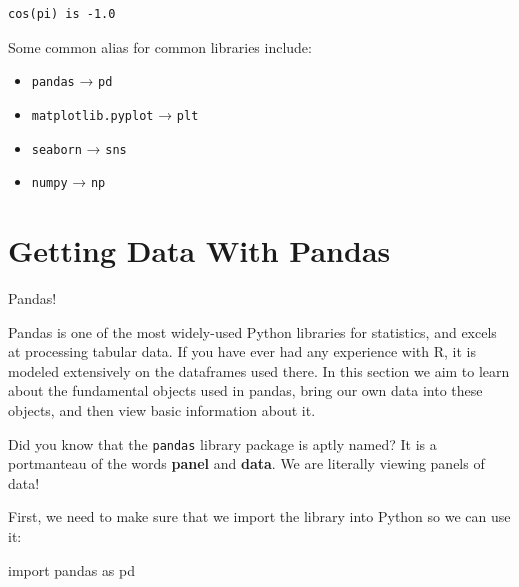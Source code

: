 \documentclass[
  letterpaper,
  DIV=11,
  numbers=noendperiod]{scrreprt}
\newenvironment{Shaded}{\begin{snugshade}}{\end{snugshade}}
\newcommand{\ImportTok}[1]{\textcolor[rgb]{0.00,0.46,0.62}{#1}}
\newcommand{\NormalTok}[1]{\textcolor[rgb]{0.00,0.23,0.31}{#1}}
\providecommand{\tightlist}{%
  \setlength{\itemsep}{0pt}\setlength{\parskip}{0pt}}\usepackage{longtable,booktabs,array}
\begin{document}
\begin{verbatim}
cos(pi) is -1.0
\end{verbatim}

Some common alias for common libraries include:

\begin{itemize}
\tightlist
\item
  \texttt{pandas} → \texttt{pd}
\item
  \texttt{matplotlib.pyplot} → \texttt{plt}
\item
  \texttt{seaborn} → \texttt{sns}
\item
  \texttt{numpy} → \texttt{np}
\end{itemize}


\hypertarget{getting-data-with-pandas}{%
\chapter{Getting Data With Pandas}\label{getting-data-with-pandas}}

Pandas!

Pandas is one of the most widely-used Python libraries for statistics,
and excels at processing tabular data. If you have ever had any
experience with R, it is modeled extensively on the dataframes used
there. In this section we aim to learn about the fundamental objects
used in pandas, bring our own data into these objects, and then view
basic information about it.

\begin{tcolorbox}[enhanced jigsaw, rightrule=.15mm, opacitybacktitle=0.6, colback=white, toprule=.15mm, colframe=quarto-callout-tip-color-frame, bottomtitle=1mm, bottomrule=.15mm, arc=.35mm, coltitle=black, breakable, title=\textcolor{quarto-callout-tip-color}{\faLightbulb}\hspace{0.5em}{Did You Know?}, titlerule=0mm, opacityback=0, colbacktitle=quarto-callout-tip-color!10!white, left=2mm, toptitle=1mm, leftrule=.75mm]
Did you know that the \texttt{pandas} library package is aptly named? It
is a portmanteau of the words \textbf{panel} and \textbf{data}. We are
literally viewing panels of data!
\end{tcolorbox}

First, we need to make sure that we import the library into Python so we
can use it:

\begin{Shaded}
\begin{Highlighting}[]
\ImportTok{import}\NormalTok{ pandas }\ImportTok{as}\NormalTok{ pd}
\end{Highlighting}
\end{Shaded}
\end{document}
